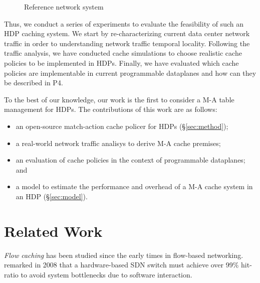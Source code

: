 \begin{figure}[]
	\centering
	
	\caption{Reference network system}
	\label{fig:high_level_network}
\end{figure}


Thus, we conduct a series of experiments to evaluate the feasibility of such an HDP caching system.
We start by re-characterizing current data center network traffic in order to understanding network traffic temporal locality.
Following the traffic analysis, we have conducted cache simulations to choose realistic cache policies to be implemented in HDPs.
Finally, we have evaluated which cache policies are implementable in current programmable dataplanes and how can they be described in P4.

To the best of our knowledge, our work is the first to consider a M-A  table management for HDPs.
The contributions of this work are as follows: 

\begin{itemize}[noitemsep,topsep=0pt]
	\item an open-source match-action cache policer for HDPs (\S\ref{sec:method});
	\item a real-world network traffic analisys to derive M-A cache premises;
	\item an evaluation of cache policies in the context of programmable dataplanes; and
	\item a model to estimate the performance and overhead of a M-A cache system in an HDP (\S\ref{sec:model}).
\end{itemize}

\section{Related Work}\label{sec:related_works}

\textit{Flow caching} has been studied since the early times in flow-based networking.
\citeauthor{casado:2008}~\cite{casado:2008} remarked in 2008 that a hardware-based SDN switch must achieve over 99\% hit-ratio to avoid system bottlenecks due to software interaction.


